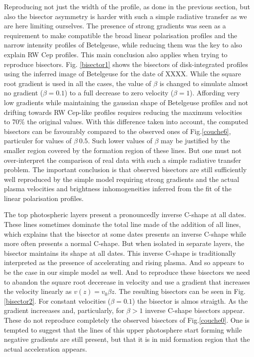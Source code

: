 \documentclass{/Users/art2/TeX/aanda/aa}
\begin{document}
Reproducing not just the width of the profile, as done in the previous section, but also the bisector asymmetry is harder with such 
a simple radiative transfer as we are here limiting ourselves. The presence of strong gradients was seen as a requirement to make 
compatible the broad linear polarisation profiles and the narrow intensity profiles of Betelgeuse, while reducing them was the key 
to also explain RW Cep profiles. This main conclusion also applies when trying to reproduce bisectors. Fig. \ref{bisector1} shows 
the bisectors of disk-integrated profiles using the inferred image of Betelgeuse for the date of XXXX. While the square root gradient 
is used in all the cases, the value of $\beta$ is changed to simulate almost no gradient ($\beta=0.1$) to a full decrease to zero 
velocity ($\beta=1$). Affording very low gradients while maintaining the gaussian shape of Betelgeuse profiles and not drifting towards 
RW Cep-like profiles requires reducing the maximum velocities to 70\% the original values. With this difference taken into account, 
the computed bisectors can be favourably compared to the observed ones of Fig.\ref{couche6}, particuler for values of $\beta~0.5$. 
Such lower values of $\beta$ may be justified by the smaller region covered by the formation region of these lines. But one must 
not over-interpret the comparison of real data with such a simple radiative transfer problem. The important conclusion is that 
observed bisectors are still sufficiently well reproduced by the simple model requiring strong gradients and the actual plasma velocities 
and brightness inhomogeneities inferred from the fit of the linear polarisation profiles. 

The top photospheric layers present a pronouncedly inverse C-shape at all dates. These lines sometimes dominate the total line 
made of the addition of all lines, which explains that the bisector at some dates presents an inverse C-shape while more often 
presents a normal C-shape. But when isolated in separate layers, the bisector maintains its shape at all dates. This inverse C-shape 
is traditionally interpreted as the presence of accelerating and rising plasma. And so appears to be the case in our simple model 
as well. And to reproduce these bisectors we need to abandon the square root decerease in velocity and use a gradient that increases 
the velocity linearly as $v(z)=v_0\beta z$. The resulting bisectors can be seen in  Fig. \ref{bisector2}. For constant velocities 
($\beta=0.1$) the bisector is almos straigth. As the gradient increeases and, particularly, for $\beta >1$ inverse C-shape bisectors 
appear. These do not reproduce completely the observed bisectors of Fig.\ref{couche0}. One is tempted to suggest that the lines 
of this upper photosphere start forming while negative gradients are still present, but that it is in mid formation region that 
the actual acceleration appears. 
\end{document}
